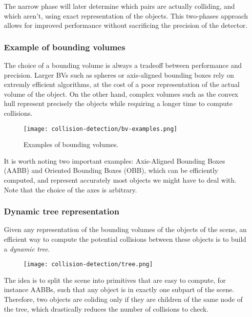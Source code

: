 The narrow phase will later determine which pairs are actually colliding, and which aren't, using exact representation of the objects. This two-phases approach allows for improved performance without sacrificing the precision of the detector.

\subsubsection{Example of bounding volumes}
The choice of a bounding volume is always a tradeoff between performance and precision. Larger BVs such as spheres or axis-aligned bounding boxes rely on extremly efficient algorithms, at the cost of a poor representation of the actual volume of the object. On the other hand, complex volumes such as the convex hull represent precisely the objects while requiring a longer time to compute collisions.
\begin{figure}[H]
    \centering
    \texttt{[image: collision-detection/bv-examples.png]}
    \caption{Examples of bounding volumes.}
\end{figure}
It is worth noting two important examples: Axis-Aligned Bounding Boxes (AABB) and Oriented Bounding Boxes (OBB), which can be efficiently computed, and represent accurately most objects we might have to deal with. Note that the choice of the axes is arbitrary.

\subsubsection{Dynamic tree representation}
Given any representation of the bounding volumes of the objects of the scene, an efficient way to compute the potential collisions between these objects is to build a \emph{dynamic tree}.
\begin{figure}[H]
    \centering
    \texttt{[image: collision-detection/tree.png]}
\end{figure}
The idea is to split the scene into primitives that are easy to compute, for instance AABBs, such that any object is in exactly one subpart of the scene. Therefore, two objects are coliding only if they are children of the same node of the tree, which drastically reduces the number of collisions to check.

